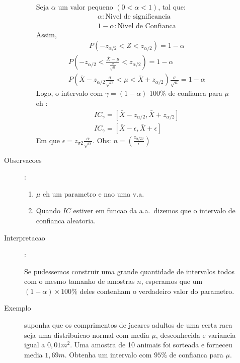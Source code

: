 \begin{description}
\begin{description}
\begin{enumerate}[label=(\alph*)]
            Seja $\alpha$ um valor pequeno $(0 < \alpha <1)$, tal que:
\begin{align*}
  \alpha : \text{Nivel de significancia}  \\
1- \alpha : \text{Nivel de Confianca}
\end{align*}
Assim, 
\begin{align*}
  P( -z_{\alpha/2} < Z < z_{\alpha/2} ) = 1-\alpha
\end{align*}
\begin{align*}
  P \left( -z_{\alpha/2} < \frac{\bar{X}- \mu}{\frac{\sigma}{\sqrt{n}}}< z_{\alpha/2}\right) = 1-\alpha \\
  P \left(\bar{X} -z_{\alpha/2} {\frac{\sigma}{\sqrt{n}}}< \mu<\bar{X}+ z_{\alpha/2}\right){\frac{\sigma}{\sqrt{n}}} = 1-\alpha 
\end{align*}
Logo, o intervalo com $\gamma = (1-\alpha)$ 100\% de confianca para $\mu$ eh :
\begin{align*}
  IC_{\gamma}= \left[\bar{X}- z_{\alpha/2} , \bar{X}+ z_{\alpha/2}  \right] \\
  IC_{\gamma} = \left[ \bar{X}- \epsilon , \bar{X}+\epsilon \right]
\end{align*} 
Em que $\epsilon= z_{\sigma2} \frac{\alpha}{\sqrt{n}}$. Obs: $n= \left(\frac{z_{\alpha/2\sigma}}{\epsilon}\right)$
        \end{enumerate}
      \item [Observacoes]:
        \begin{enumerate}
          \item $\mu$ eh um parametro e nao uma v.a.\
          \item Quando $IC$ estiver em funcao da a.a.\ dizemos que o intervalo de confianca aleatoria.
        \end{enumerate}
      \item [Interpretacao]:

        Se pudessemos construir uma grande quantidade de intervalos todos com o mesmo tamanho de amostras $n$, esperamos que 
        um $(1-\alpha)\times 100\%$ deles contenham o verdadeiro valor do parametro.
      \item [Exemplo] suponha que os comprimentos de jacares adultos de uma certa raca seja uma distribuicao normal com media $\mu$, desconhecida e variancia igual a $0,01m^2$. Uma amostra de 10 animais foi sorteada e forneceu media $1,69m$. Obtenha um intervalo com $95\%$ de confianca para $\mu$.


\end{description}
\end{description}
